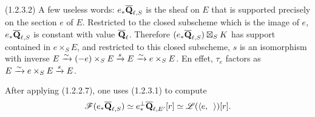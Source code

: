 \documentclass[deligne.tex]{subfiles}
\begin{document}
(1.2.3.2) A few useless words: $e_*\overline{\mathbf{Q}}_{\ell,S}$ is the sheaf on
$E$ that is supported precisely on the section $e$ of $E$. Restricted to
the closed subscheme which is the image of $e$, $e_*\overline{\mathbf{Q}}_{\ell,S}$
is constant with value $\overline{\mathbf{Q}}_{\ell}$. Therefore
$(e_*\overline{\mathbf{Q}}_{\ell,S})\boxtimes_SK$ has support contained in
$e\times_S E$, and restricted to this closed subscheme, $s$ is an
isomorphism with inverse $E\xrightarrow\sim(-e)\times_SE\xrightarrow sE\xrightarrow\sim e\times_SE$.
En effet, $\tau_e$ factors as $E\xrightarrow\sim e\times_SE\xrightarrow sE$.

After applying (1.2.2.7), one uses (1.2.3.1) to compute
\begin{equation*}
	\mathscr F(e_*\overline{\mathbf{Q}}_{\ell,S})
	\simeq e^\perp_*\overline{\mathbf{Q}}_{\ell,E'}[r]
	\simeq\mathscr L(\langle e,\enskip\rangle)[r].
\end{equation*}
\end{document}
